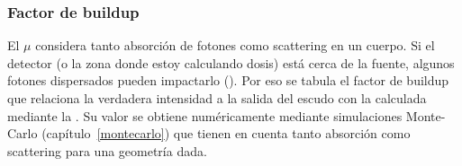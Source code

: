 \subsubsection{Factor de buildup}
El $\mu$ considera tanto absorción de fotones como scattering en un cuerpo.
Si el detector (o la zona donde estoy calculando dosis) 
está cerca de la fuente, 
algunos fotones dispersados pueden impactarlo ().
Por eso se tabula el factor de buildup
que relaciona la verdadera intensidad a la salida del escudo 
con la calculada mediante la .
Su valor se obtiene numéricamente mediante simulaciones Monte-Carlo
(capítulo~\ref{montecarlo})
que tienen en cuenta tanto absorción como scattering
para una geometría dada.

